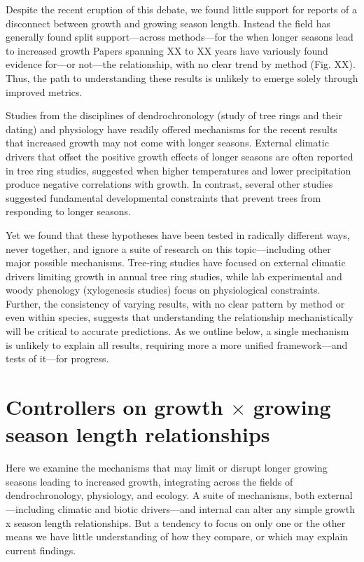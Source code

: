 \documentclass[11pt]{article}
\begin{document}
Despite the recent eruption of this debate, we found little support for reports of a disconnect between growth and growing season length. Instead the field has generally found split support---across methods---for the when longer seasons lead to increased growth  Papers spanning XX to XX years have variously found evidence for---or not---the relationship, with no clear trend by method (Fig. XX). Thus, the path to understanding these results is unlikely to emerge solely through improved metrics. 

Studies from the disciplines of dendrochronology (study of tree rings and their dating) and physiology have readily offered mechanisms for the recent results that increased growth may not come with longer seasons. External climatic drivers that offset the positive growth effects of longer seasons are often reported in tree ring studies, suggested when higher temperatures and lower precipitation produce negative correlations with growth. In contrast, several other studies suggested fundamental developmental constraints that prevent trees from responding to longer seasons. 

Yet we found that these hypotheses have been tested in radically different ways, never together, and ignore a suite of research on this topic---including other major possible mechanisms. Tree-ring studies have focused on external climatic drivers limiting growth in annual tree ring studies, while lab experimental and woody phenology (xylogenesis studies) focus on physiological constraints. Further, the consistency of varying results, with no clear pattern by method or even within species, suggests that understanding the relationship mechanistically will be critical to accurate predictions. As we outline below, a single mechanism is unlikely to explain all results, requiring more a more unified framework---and tests of it---for progress. 
 
\section*{Controllers on growth $\times$ growing season length relationships}

Here we examine the mechanisms that may limit or disrupt longer growing seasons leading to increased growth, integrating across the fields of dendrochronology, physiology, and ecology. A suite of mechanisms, both external---including climatic and biotic drivers---and internal can alter any simple growth x season length relationships. But a tendency to focus on only one or the other means we have little understanding of how they compare, or which may explain current findings. 
\end{document}
